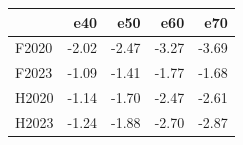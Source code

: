 \begin{tabular}{lrrrr}
\toprule
 & e40 & e50 & e60 & e70 \\
\midrule
F2020 & -2.02 & -2.47 & -3.27 & -3.69 \\
F2023 & -1.09 & -1.41 & -1.77 & -1.68 \\
H2020 & -1.14 & -1.70 & -2.47 & -2.61 \\
H2023 & -1.24 & -1.88 & -2.70 & -2.87 \\
\bottomrule
\end{tabular}
